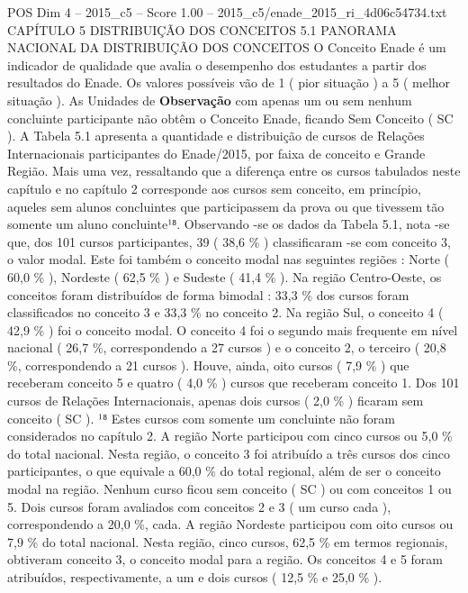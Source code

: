 \begin{textsample}{POS Dim 4 – 2015\_c5 – Score 1.00 – 2015\_c5/enade\_2015\_ri\_4d06c54734.txt}  \label{ex:f4_pos_168}
CAPÍTULO 5 DISTRIBUIÇÃO DOS CONCEITOS 5.1 PANORAMA NACIONAL DA DISTRIBUIÇÃO DOS CONCEITOS O Conceito Enade é um indicador de qualidade que avalia o desempenho dos estudantes a partir dos resultados do Enade.
Os valores possíveis vão de 1 ( pior situação ) a 5 ( melhor situação ).
As Unidades de \textbf{Observação} com apenas um ou sem nenhum concluinte participante não obtêm o Conceito Enade, ficando Sem Conceito ( SC ).
A Tabela 5.1 apresenta a quantidade e distribuição de cursos de Relações Internacionais participantes do Enade/2015, por faixa de conceito e Grande Região.
Mais uma vez, ressaltando que a diferença entre os cursos tabulados neste capítulo e no capítulo 2 corresponde aos cursos sem conceito, em princípio, aqueles sem alunos concluintes que participassem da prova ou que tivessem tão somente um aluno concluinte¹⁸.
Observando -se os dados da Tabela 5.1, nota -se que, dos 101 cursos participantes, 39 ( 38,6 \% ) classificaram -se com conceito 3, o valor modal.
Este foi também o conceito modal nas seguintes regiões : Norte ( 60,0 \% ), Nordeste ( 62,5 \% ) e Sudeste ( 41,4 \% ).
Na região Centro-Oeste, os conceitos foram distribuídos de forma bimodal : 33,3 \% dos cursos foram classificados no conceito 3 e 33,3 \% no conceito 2.
Na região Sul, o conceito 4 ( 42,9 \% ) foi o conceito modal.
O conceito 4 foi o segundo mais frequente em nível nacional ( 26,7 \%, correspondendo a 27 cursos ) e o conceito 2, o terceiro ( 20,8 \%, correspondendo a 21 cursos ).
Houve, ainda, oito cursos ( 7,9 \% ) que receberam conceito 5 e quatro ( 4,0 \% ) cursos que receberam conceito 1.
Dos 101 cursos de Relações Internacionais, apenas dois cursos ( 2,0 \% ) ficaram sem conceito ( SC ). ¹⁸ Estes cursos com somente um concluinte não foram considerados no capítulo 2.
A região Norte participou com cinco cursos ou 5,0 \% do total nacional.
Nesta região, o conceito 3 foi atribuído a três cursos dos cinco participantes, o que equivale a 60,0 \% do total regional, além de ser o conceito modal na região.
Nenhum curso ficou sem conceito ( SC ) ou com conceitos 1 ou 5.
Dois cursos foram avaliados com conceitos 2 e 3 ( um curso cada ), correspondendo a 20,0 \%, cada.
A região Nordeste participou com oito cursos ou 7,9 \% do total nacional.
Nesta região, cinco cursos, 62,5 \% em termos regionais, obtiveram conceito 3, o conceito modal para a região.
Os conceitos 4 e 5 foram atribuídos, respectivamente, a um e dois cursos ( 12,5 \% e 25,0 \% ).

\end{textsample}
